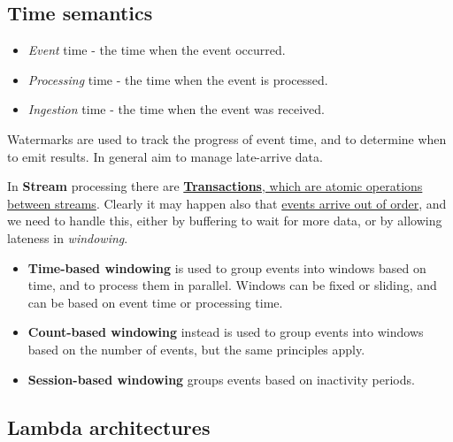 \subsection{Time semantics}
\begin{itemize}
   \item \textit{Event} time - the time when the event occurred.
   \item \textit{Processing} time - the time when the event is processed. 
   \item \textit{Ingestion} time - the time when the event was received. 
\end{itemize}

Watermarks are used to track the progress of event time, and to determine when to emit results. In general aim to manage late-arrive data.

In \textbf{Stream} processing there are \ul{\textbf{Transactions}, which are atomic operations between streams}.
Clearly it may happen also that \ul{events arrive out of order}, and we need to handle this, either by buffering to wait for more data, or by allowing lateness in \textit{windowing}.

\begin{itemize}
	\item \textbf{Time-based windowing} is used to group events into windows based on time, and to process them in parallel. Windows can be fixed or sliding, and can be based on event time or processing time.
	\item \textbf{Count-based windowing} instead is used to group events into windows based on the number of events, but the same principles apply.
	\item \textbf{Session-based windowing} groups events based on inactivity periods.
\end{itemize}

\subsection{Lambda architectures}

